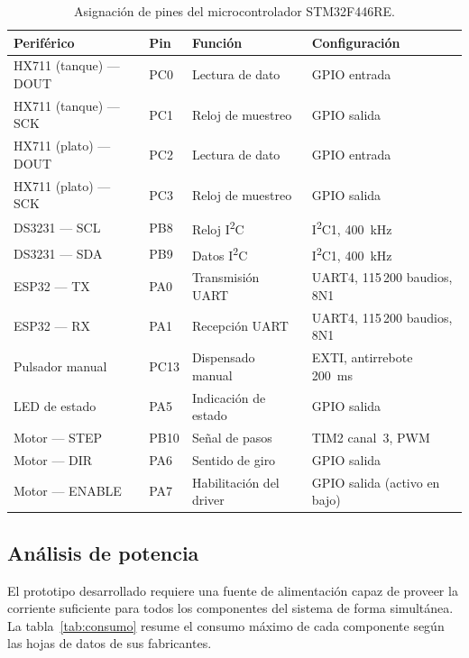 \begin{table}[H]
\centering
\caption{Asignación de pines del microcontrolador STM32F446RE.}
\label{tab:asignacion_pines}
\begin{tabular}{llll}
\toprule
\textbf{Periférico} & \textbf{Pin} & \textbf{Función} & \textbf{Configuración} \\
\midrule
HX711 (tanque) — DOUT & PC0  & Lectura de dato      & GPIO entrada \\
HX711 (tanque) — SCK  & PC1  & Reloj de muestreo    & GPIO salida \\
HX711 (plato) — DOUT  & PC2  & Lectura de dato      & GPIO entrada \\
HX711 (plato) — SCK   & PC3  & Reloj de muestreo    & GPIO salida \\
DS3231 — SCL          & PB8  & Reloj I\textsuperscript{2}C   & I\textsuperscript{2}C1, 400~kHz \\
DS3231 — SDA          & PB9  & Datos I\textsuperscript{2}C   & I\textsuperscript{2}C1, 400~kHz \\
ESP32 — TX            & PA0  & Transmisión UART     & UART4, 115\,200 baudios, 8N1 \\
ESP32 — RX            & PA1  & Recepción UART       & UART4, 115\,200 baudios, 8N1 \\
Pulsador manual       & PC13 & Dispensado manual    & EXTI, antirrebote 200~ms \\
LED de estado         & PA5  & Indicación de estado & GPIO salida \\
Motor — STEP          & PB10 & Señal de pasos       & TIM2 canal~3, PWM \\
Motor — DIR           & PA6  & Sentido de giro      & GPIO salida \\
Motor — ENABLE        & PA7  & Habilitación del driver & GPIO salida (activo en bajo) \\
\bottomrule
\end{tabular}
\end{table}

\vspace{0.2cm}

\subsection{Análisis de potencia}

El prototipo desarrollado requiere una fuente de alimentación capaz de proveer la
corriente suficiente para todos los componentes del sistema de forma simultánea.
La tabla~\ref{tab:consumo} resume el consumo máximo de cada componente según las
hojas de datos de sus fabricantes.

